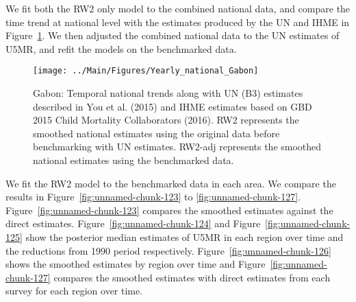 \documentclass[12pt]{article}\usepackage[]{graphicx}\usepackage[]{color}
\newenvironment{knitrout}{}{} %
\begin{document}
We fit both the RW2 only model to the combined national data, and compare the time trend at national level with the estimates produced by the UN and IHME in Figure~\ref{fig:unnamed-chunk-122}. We then adjusted the combined national data to the UN estimates of U5MR, and refit the models on the benchmarked data. 

\begin{knitrout}
\color{fgcolor}\begin{figure}[bht]

{\centering \texttt{[image: ../Main/Figures/Yearly\_national\_Gabon]} 

}

\caption[Gabon]{Gabon: Temporal national trends along with UN (B3) estimates described in You et al. (2015) and IHME estimates based on GBD 2015 Child Mortality Collaborators (2016). RW2 represents the smoothed national estimates using the original data before benchmarking with UN estimates. RW2-adj represents the smoothed national estimates using the benchmarked data.}\label{fig:unnamed-chunk-122}
\end{figure}


\end{knitrout}
 

We fit the RW2 model to the benchmarked data in each area. 
We compare the results in Figure~\ref{fig:unnamed-chunk-123} to \ref{fig:unnamed-chunk-127}.
Figure~\ref{fig:unnamed-chunk-123} compares the smoothed estimates against the direct estimates. Figure~\ref{fig:unnamed-chunk-124} and Figure~\ref{fig:unnamed-chunk-125} show the posterior median estimates of U5MR in each region over time and the reductions from 1990 period respectively.
Figure~\ref{fig:unnamed-chunk-126} shows the smoothed estimates by region over time and Figure~\ref{fig:unnamed-chunk-127} compares the smoothed estimates with direct estimates from each survey for each region over time.




\end{document}
